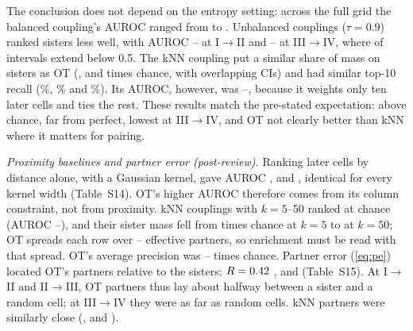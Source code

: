 \documentclass[10pt,journal,compsoc]{IEEEtran}
\begin{document}
The conclusion does not depend on the entropy setting: across the full grid the balanced
coupling's AUROC ranged from \rqOneBalAUROCMin{} to \rqOneBalAUROCMax. Unbalanced
couplings ($\tau=0.9$) ranked sisters less well, with AUROC
\rqOneUnbAUROCMinOne--\rqOneUnbAUROCMaxOne{} at I$\to$II and
\rqOneUnbAUROCMinThree--\rqOneUnbAUROCMaxThree{} at III$\to$IV, where
\rqOneUnbThreeLoCIBelowHalf{} of \rqOneUnbThreeN{} intervals extend below 0.5. The kNN
coupling put a similar share of mass on sisters as OT (\rqOneKnnEnrOne, \rqOneKnnEnrTwo{}
and \rqOneKnnEnrThree{} times chance, with overlapping CIs) and had similar top-10 recall
(\rqOneKnnTopTenPctOne\%, \rqOneKnnTopTenPctTwo\% and \rqOneKnnTopTenPctThree\%). Its
AUROC, however, was \rqOneKnnAUROCMinAll--\rqOneKnnAUROCMaxAll, because it weights only
ten later cells and ties the rest. These results match the pre-stated expectation: above
chance, far from perfect, lowest at III$\to$IV, and OT not clearly better than kNN where it
matters for pairing.

\emph{Proximity baselines and partner error (post-review).} Ranking later cells by distance
alone, with a Gaussian kernel, gave AUROC \gaussAUROCOne, \gaussAUROCTwo{} and
\gaussAUROCThree{}, identical for every kernel width (Table~S14). OT's higher AUROC
therefore comes from its column constraint, not from proximity. kNN couplings with
$k=5$--50 ranked at chance (AUROC \knnAllAUROCMin--\knnAllAUROCMax), and their sister mass
fell from \knnFiveEnr{} times chance at $k=5$ to \knnFiftyEnr{} at $k=50$; OT spreads each
row over \otNeffMin--\otNeffMax{} effective partners, so enrichment must be read with that
spread. OT's average precision was \apOTRatioMin--\apOTRatioMax{} times chance. Partner
error (\ref{eq:pe}) located OT's partners relative to the sisters: $R=0.42$
\peOTCIOne, \peOTTwo{} \peOTCITwo{} and \peOTThree{} \peOTCIThree{} (Table~S15). At
I$\to$II and II$\to$III, OT partners thus lay about halfway between a sister and a random
cell; at III$\to$IV they were as far as random cells. kNN partners were similarly
close (\peKnnOne, \peKnnTwo{} and \peKnnThree).
\end{document}
